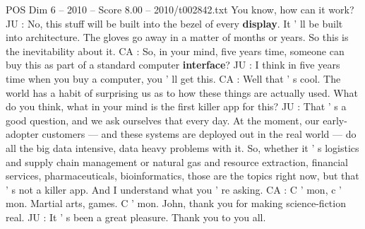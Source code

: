 \begin{textsample}{POS Dim 6 – 2010 – Score 8.00 – 2010/t002842.txt}
You know, how can it work?
JU : No, this stuff will be built into the bezel of every \textbf{display}.
It ' ll be built into architecture.
The gloves go away in a matter of months or years.
So this is the inevitability about it.
CA : So, in your mind, five years time, someone can buy this as part of a standard computer \textbf{interface}?
JU : I think in five years time when you buy a computer, you ' ll get this.
CA : Well that ' s cool.
The world has a habit of surprising us as to how these things are actually used.
What do you think, what in your mind is the first killer app for this?
JU : That ' s a good question, and we ask ourselves that every day.
At the moment, our early-adopter customers — and these systems are deployed out in the real world — do all the big data intensive, data heavy problems with it.
So, whether it ' s logistics and supply chain management or natural gas and resource extraction, financial services, pharmaceuticals, bioinformatics, those are the topics right now, but that ' s not a killer app.
And I understand what you ' re asking.
CA : C ' mon, c ' mon.
Martial arts, games.
C ' mon.
John, thank you for making science-fiction real.
JU : It ' s been a great pleasure.
Thank you to you all.

\end{textsample}
